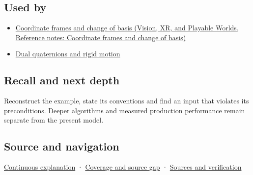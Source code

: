 \subsection{Used by}\label{appendix-0bf0ca73f735-used-by}

\hypertarget{appendix-0bf0ca73f735-used-by}{}

\begin{itemize}
\tightlist
\item
  \href{../07-Vision-XR-and-Playable-Worlds/main.pdf\#nameddest=appendix-1bae9457dbc3}{Coordinate frames and change of basis (Vision, XR, and Playable Worlds, Reference notes: Coordinate frames and change of basis)}
\item
  \hyperref[appendix-d1ea57347893]{Dual quaternions and rigid motion}
\end{itemize}

\subsection{Recall and next depth}\label{appendix-0bf0ca73f735-recall-and-next-depth}

\hypertarget{appendix-0bf0ca73f735-recall-and-next-depth}{}

Reconstruct the example, state its conventions and find an input that violates its preconditions. Deeper algorithms and measured production performance remain separate from the present model.

\subsection{Source and navigation}\label{appendix-0bf0ca73f735-source-and-navigation}

\hypertarget{appendix-0bf0ca73f735-source-and-navigation}{}

\hyperref[01-foundations-i-ch018-keep-the-promises-visible-while-moving-between-representations]{Continuous explanation} · \hyperref[appendix-fd090d982a15-phase-7---parts-601-700]{Coverage and source gap} · \hyperref[appendix-a103e7846d21-phase-7---source-analysis-and-verification]{Sources and verification}
